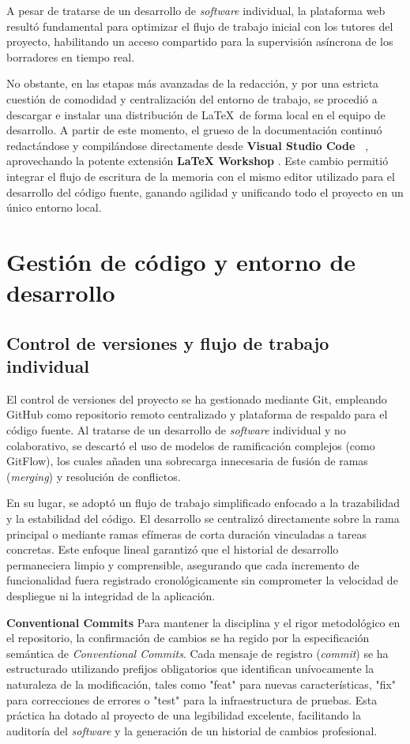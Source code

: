 A pesar de tratarse de un desarrollo de \textit{software} individual, la plataforma web resultó fundamental para optimizar el flujo de trabajo inicial con los tutores del proyecto, habilitando un acceso compartido para la supervisión asíncrona de los borradores en tiempo real. 

No obstante, en las etapas más avanzadas de la redacción, y por una estricta cuestión de comodidad y centralización del entorno de trabajo, se procedió a descargar e instalar una distribución de \LaTeX \ de forma local en el equipo de desarrollo. A partir de este momento, el grueso de la documentación continuó redactándose y compilándose directamente desde \textbf{Visual Studio Code~\cite{vscode}} \cite{vscode}, aprovechando la potente extensión \textbf{LaTeX Workshop} \cite{latexworkshop}. Este cambio permitió integrar el flujo de escritura de la memoria con el mismo editor utilizado para el desarrollo del código fuente, ganando agilidad y unificando todo el proyecto en un único entorno local.

\section{Gestión de código y entorno de desarrollo}

\subsection{Control de versiones y flujo de trabajo individual}
El control de versiones del proyecto se ha gestionado mediante Git, empleando GitHub como repositorio remoto centralizado y plataforma de respaldo para el código fuente. Al tratarse de un desarrollo de \textit{software} individual y no colaborativo, se descartó el uso de modelos de ramificación complejos (como GitFlow), los cuales añaden una sobrecarga innecesaria de fusión de ramas (\textit{merging}) y resolución de conflictos.

En su lugar, se adoptó un flujo de trabajo simplificado enfocado a la trazabilidad y la estabilidad del código. El desarrollo se centralizó directamente sobre la rama principal o mediante ramas efímeras de corta duración vinculadas a tareas concretas. Este enfoque lineal garantizó que el historial de desarrollo permaneciera limpio y comprensible, asegurando que cada incremento de funcionalidad fuera registrado cronológicamente sin comprometer la velocidad de despliegue ni la integridad de la aplicación.

\textbf{Conventional Commits}
Para mantener la disciplina y el rigor metodológico en el repositorio, la confirmación de cambios se ha regido por la especificación semántica de \textit{Conventional Commits}. Cada mensaje de registro (\textit{commit}) se ha estructurado utilizando prefijos obligatorios que identifican unívocamente la naturaleza de la modificación, tales como "feat" para nuevas características, "fix" para correcciones de errores o "test" para la infraestructura de pruebas. Esta práctica ha dotado al proyecto de una legibilidad excelente, facilitando la auditoría del \textit{software} y la generación de un historial de cambios profesional.

